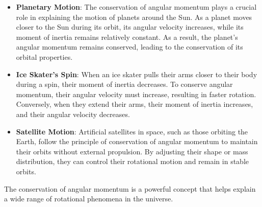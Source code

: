 \documentclass[11pt]{article}
\begin{document}
\begin{itemize}
  \item \textbf{Planetary Motion}: The conservation of angular momentum plays a crucial role in explaining the motion of planets around the Sun. As a planet moves closer to the Sun during its orbit, its angular velocity increases, while its moment of inertia remains relatively constant. As a result, the planet's angular momentum remains conserved, leading to the conservation of its orbital properties.
  
  \item \textbf{Ice Skater's Spin}: When an ice skater pulls their arms closer to their body during a spin, their moment of inertia decreases. To conserve angular momentum, their angular velocity must increase, resulting in faster rotation. Conversely, when they extend their arms, their moment of inertia increases, and their angular velocity decreases.
  
  \item \textbf{Satellite Motion}: Artificial satellites in space, such as those orbiting the Earth, follow the principle of conservation of angular momentum to maintain their orbits without external propulsion. By adjusting their shape or mass distribution, they can control their rotational motion and remain in stable orbits.
\end{itemize}

The conservation of angular momentum is a powerful concept that helps explain a wide range of rotational phenomena in the universe.
\end{document}
